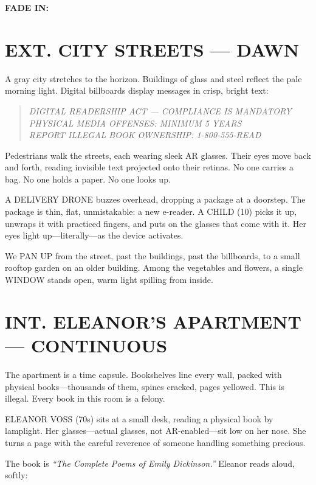 \documentclass[
    language=english,
    doctype=screenplay,
    institution=none,
]{../../omnilatex}
\begin{document}
\begin{center}
\textbf{FADE IN:}
\end{center}

\section*{EXT. CITY STREETS --- DAWN}

A gray city stretches to the horizon. Buildings of glass and steel reflect the pale morning light. Digital billboards display messages in crisp, bright text:

\begin{quote}
\textit{DIGITAL READERSHIP ACT --- COMPLIANCE IS MANDATORY}\\
\textit{PHYSICAL MEDIA OFFENSES: MINIMUM 5 YEARS}\\
\textit{REPORT ILLEGAL BOOK OWNERSHIP: 1-800-555-READ}
\end{quote}

Pedestrians walk the streets, each wearing sleek AR glasses. Their eyes move back and forth, reading invisible text projected onto their retinas. No one carries a bag. No one holds a paper. No one looks up.

A DELIVERY DRONE buzzes overhead, dropping a package at a doorstep. The package is thin, flat, unmistakable: a new e-reader. A CHILD (10) picks it up, unwraps it with practiced fingers, and puts on the glasses that come with it. Her eyes light up---literally---as the device activates.

We PAN UP from the street, past the buildings, past the billboards, to a small rooftop garden on an older building. Among the vegetables and flowers, a single WINDOW stands open, warm light spilling from inside.

\section*{INT. ELEANOR'S APARTMENT --- CONTINUOUS}

The apartment is a time capsule. Bookshelves line every wall, packed with physical books---thousands of them, spines cracked, pages yellowed. This is illegal. Every book in this room is a felony.

ELEANOR VOSS (70s) sits at a small desk, reading a physical book by lamplight. Her glasses---actual glasses, not AR-enabled---sit low on her nose. She turns a page with the careful reverence of someone handling something precious.

The book is \textit{ ``The Complete Poems of Emily Dickinson.''} Eleanor reads aloud, softly:
\end{document}
